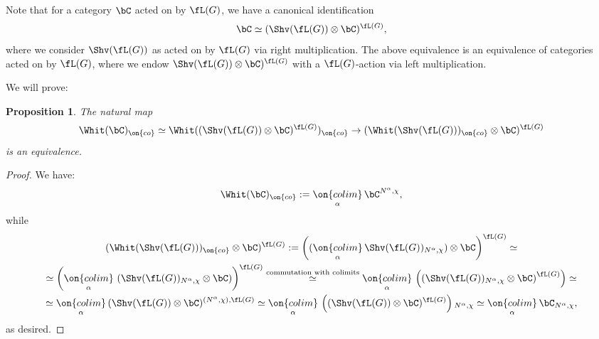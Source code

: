 \documentclass[9pt]{amsart}
\newtheorem{prop}[subsubsection]{Proposition}
\theoremstyle{definition}
\theoremstyle{remark}
\numberwithin{equation}{section}
\begin{document}
\sssec{}

Note that for a category $\bC$ acted on by $\fL(G)$, we have a canonical identification 
$$\bC\simeq (\Shv(\fL(G))\otimes \bC)^{\fL(G)},$$
where we consider $\Shv(\fL(G))$ as acted on by $\fL(G)$ via right multiplication. The above equivalence is
an equivalence of categories acted on by $\fL(G)$, where we endow $\Shv(\fL(G))\otimes \bC)^{\fL(G)}$
with a $\fL(G)$-action via left multiplication.

\medskip

We will prove:

\begin{prop} \label{p:Whit co ten}
The natural map
$$\Whit(\bC)_{\on{co}}\simeq \Whit((\Shv(\fL(G))\otimes \bC)^{\fL(G)})_{\on{co}}\to (\Whit(\Shv(\fL(G)))_{\on{co}}\otimes \bC)^{\fL(G)}$$
is an equivalence.
\end{prop}

\begin{proof}

We have:
$$\Whit(\bC)_{\on{co}}:=\underset{\alpha}{\on{colim}}\, \bC^{N^\alpha,\chi},$$
while
\begin{multline*}
(\Whit(\Shv(\fL(G)))_{\on{co}}\otimes \bC)^{\fL(G)}:=\left((\underset{\alpha}{\on{colim}}\, \Shv(\fL(G))_{N^\alpha,\chi}) \otimes \bC\right)^{\fL(G)}\simeq \\
\simeq \left(\underset{\alpha}{\on{colim}}\, \left(\Shv(\fL(G))_{N^\alpha,\chi}\otimes \bC\right)\right)^{\fL(G)}\overset{\text{commutation with colimits}}\simeq 
\underset{\alpha}{\on{colim}}\, \left(\left(\Shv(\fL(G))_{N^\alpha,\chi} \otimes \bC\right)^{\fL(G)}\right)\simeq \\
\simeq \underset{\alpha}{\on{colim}}\, (\Shv(\fL(G))\otimes \bC)^{(N^\alpha,\chi),\fL(G)}\simeq 
\underset{\alpha}{\on{colim}}\, \left((\Shv(\fL(G))\otimes \bC)^{\fL(G)}\right){}_{N^\alpha,\chi}\simeq 
\underset{\alpha}{\on{colim}}\, \bC_{N^\alpha,\chi},
\end{multline*}
as desired. 

\end{proof}
\end{document}
